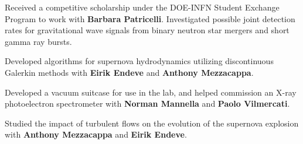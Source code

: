\documentclass[letterpaper]{deedy-resume} %
\begin{document}


Received a competitive scholarship under the DOE-INFN Student Exchange Program to work with \textbf{Barbara Patricelli}. Investigated possible joint detection rates for gravitational wave signals from binary neutron star mergers and short gamma ray bursts.

\sectionspace %



Developed algorithms for supernova hydrodynamics utilizing discontinuous Galerkin methods with \textbf{Eirik Endeve} and \textbf{Anthony Mezzacappa}.

\sectionspace %



Developed a vacuum suitcase for use in the lab, and helped commission an X-ray photoelectron spectrometer with \textbf{Norman Mannella} and \textbf{Paolo Vilmercati}.

\sectionspace %



Studied the impact of turbulent flows on the evolution of the supernova explosion with \textbf{Anthony Mezzacappa} and \textbf{Eirik Endeve}.

\sectionspace %



\end{document}
